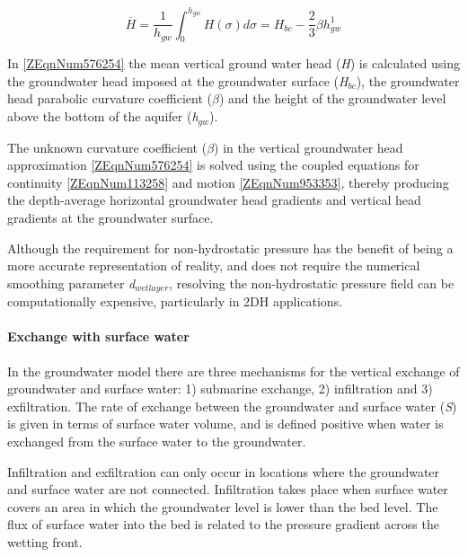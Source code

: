 \documentclass{article}
\begin{document}
\noindent 
\begin{equation} \label{ZEqnNum576254} 
\overline{H}=\frac{1}{h_{gw} } \int _{0}^{h_{gw} }H(\sigma )d\sigma =H_{bc} -\frac{2}{3} \beta h_{gw}^{1}   
\end{equation} 


\noindent In \eqref{ZEqnNum576254} the mean vertical ground water head (\textit{H}) is calculated using the groundwater head imposed at the groundwater surface (\textit{H${}_{bc}$}), the groundwater head parabolic curvature coefficient (\textit{$\beta $}) and the height of the groundwater level above the bottom of the aquifer (\textit{h${}_{gw}$}). 

\noindent 

\noindent The unknown curvature coefficient (\textit{$\beta $}) in the vertical groundwater head approximation \eqref{ZEqnNum576254} is solved using the coupled equations for continuity \eqref{ZEqnNum113258} and motion \eqref{ZEqnNum953353}, thereby producing the depth-average horizontal groundwater head gradients and vertical head gradients at the groundwater surface.

\noindent 

\noindent Although the requirement for non-hydrostatic pressure has the benefit of being a more accurate representation of reality, and does not require the numerical smoothing parameter \textit{d${}_{wetlayer}$}, resolving the non-hydrostatic pressure field can be computationally expensive, particularly in 2DH applications.


\paragraph{ Exchange with surface water}

\noindent In the groundwater model there are three mechanisms for the vertical exchange of groundwater and surface water: 1) submarine exchange, 2) infiltration and 3) exfiltration. The rate of exchange between the groundwater and surface water (\textit{S}) is given in terms of surface water volume, and is defined positive when water is exchanged from the surface water to the groundwater. 

\noindent 

\noindent Infiltration and exfiltration can only occur in locations where the groundwater and surface water are not connected. Infiltration takes place when surface water covers an area in which the groundwater level is lower than the bed level. The flux of surface water into the bed is related to the pressure gradient across the wetting front.
\end{document}
